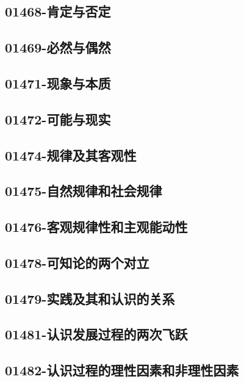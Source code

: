 \subsection{01468-肯定与否定}

\subsection{01469-必然与偶然}

\subsection{01471-现象与本质}

\subsection{01472-可能与现实}

\subsection{01474-规律及其客观性}

\subsection{01475-自然规律和社会规律}

\subsection{01476-客观规律性和主观能动性}

\subsection{01478-可知论的两个对立}

\subsection{01479-实践及其和认识的关系}

\subsection{01481-认识发展过程的两次飞跃}

\subsection{01482-认识过程的理性因素和非理性因素}

